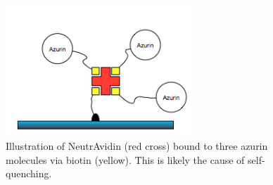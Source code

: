 \documentclass[twoside,single]{lion-msc}
\begin{document}
\begin{figure}[ht!]
\centering
\includegraphics[width=70mm]{ratio_avadin}
\caption{Illustration of NeutrAvidin (red cross) bound to three azurin molecules via biotin (yellow). This is likely the cause of self-quenching.}
\label{avidinratio}
\end{figure}
\end{document}
